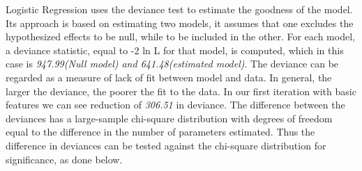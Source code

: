 \documentclass[a4paper,10pt]{report}\usepackage[]{graphicx}\usepackage[]{color}
\begin{document}
Logistic Regression uses the deviance test to estimate the goodness of the model. Its approach is based on estimating two models, it assumes that one excludes the hypothesized effects to be null, while to be included in 
the other. For each model, a deviance statistic, equal to -2 ln L for that model, is computed, which in this case is
\emph{947.99(Null model) and 641.48(estimated model)}. The deviance can be regarded as a measure of lack of fit between 
model and data. In general, the larger the deviance, the poorer the fit to the data. In our first iteration with basic
features we can see reduction of \emph{306.51} in deviance. The difference between the deviances has a large-sample chi-square distribution with degrees of freedom equal to the difference in the number of parameters estimated. Thus the difference in deviances can be tested against the chi-square distribution for significance, as done below.
\end{document}
